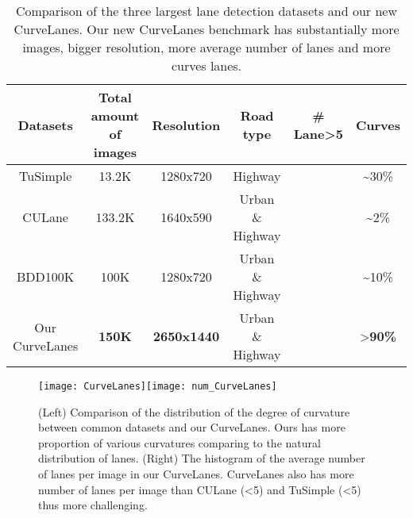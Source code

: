 \documentclass[runningheads]{llncs}
\providecommand{\tabularnewline}{\\}
\begin{document}
\begin{table}[tb]
\caption{\label{tab:Comparsion-of-three-dataset}Comparison of the three largest
lane detection datasets and our new CurveLanes. Our new CurveLanes
benchmark has substantially more images, bigger resolution, more average
number of lanes and more curves lanes.}



\begin{centering}
\tabcolsep 0.02in{\footnotesize{}}\begin{tabular}{cccccc}
\hline 
{\scriptsize{}Datasets} & {\scriptsize{}Total amount of images} & {\scriptsize{}Resolution} & {\scriptsize{}Road type} & {\scriptsize{}\# Lane\textgreater 5} & {\scriptsize{}Curves}\tabularnewline
\hline 
{\scriptsize{}TuSimple \cite{TuSimple}} & {\scriptsize{}13.2K} & {\scriptsize{}1280x720} & {\scriptsize{}Highway} & {\scriptsize{}} & {\scriptsize{}\textasciitilde 30\%}\tabularnewline
{\scriptsize{}CULane \cite{pan2018spatial}} & {\scriptsize{}133.2K} & {\scriptsize{}1640x590} & {\scriptsize{}Urban \& Highway} & {\scriptsize{}} & {\scriptsize{}\textasciitilde 2\%}\tabularnewline
{\scriptsize{}BDD100K \cite{yu2018bdd100k}} & {\scriptsize{}100K} & {\scriptsize{}1280x720} & {\scriptsize{}Urban \& Highway} & \textbf{\scriptsize{}} & {\scriptsize{}\textasciitilde 10\%}\tabularnewline
{\scriptsize{}Our CurveLanes} & \textbf{\scriptsize{}150K} & \textbf{\scriptsize{}2650x1440} & {\scriptsize{}Urban \& Highway} & \textbf{\scriptsize{}} & {\scriptsize{}\textgreater}\textbf{\scriptsize{}90\%}\tabularnewline
\hline 
\end{tabular}{\footnotesize\par}
\par\end{centering}

\end{table}

\begin{figure}[tb]


\begin{centering}
\texttt{[image: CurveLanes]}\texttt{[image: num\_CurveLanes]}
\par\end{centering}


\caption{\label{fig:Examples-of-CurveLanes-1}(Left) Comparison of the distribution
of the degree of curvature between common datasets and our CurveLanes.
Ours has more proportion of various curvatures comparing to the natural
distribution of lanes. (Right) The histogram of the average number
of lanes per image in our CurveLanes. CurveLanes also has more number
of lanes per image than CULane (\textless 5) and TuSimple (\textless 5)
thus more challenging.}


\end{figure}
\end{document}
